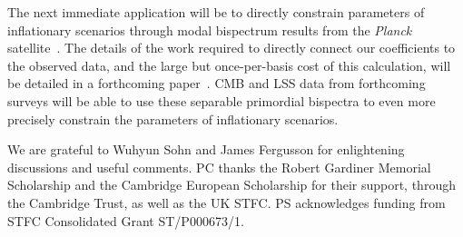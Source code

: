 \documentclass[a4paper,12pt]{extarticle}
\begin{document}
The next immediate application will be to directly constrain parameters of
inflationary scenarios through modal bispectrum results from the \textit{Planck} satellite~\cite{Planck_NG_2018}.
The details of the work required to directly connect our coefficients to the observed data,
and the large but once-per-basis cost of this calculation, will be detailed in
a forthcoming paper~\cite{Sohn_2020}.
CMB and LSS data from forthcoming surveys will be able to use
these separable primordial bispectra to even more precisely constrain the
parameters of inflationary scenarios.

\acknowledgments
We are grateful to Wuhyun Sohn and James Fergusson for enlightening discussions and useful comments.
PC thanks the Robert Gardiner Memorial Scholarship and the Cambridge European Scholarship
for their support, through the Cambridge Trust, as well as the UK STFC.
PS acknowledges funding from STFC Consolidated Grant ST/P000673/1.

%


\end{document}

